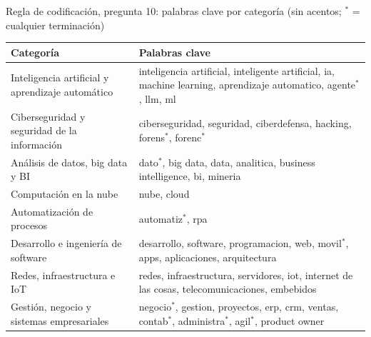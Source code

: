 \begin{mitabla}{Regla de codificación, pregunta 10: palabras clave por categoría (sin acentos; $^{*}$ = cualquier terminación)}
\begin{tabular}{L{5.2cm}L{9.4cm}}
\toprule
Categoría & Palabras clave \\
\midrule
Inteligencia artificial y aprendizaje automático & inteligencia artificial, inteligente artificial, ia, machine learning, aprendizaje automatico, agente$^{*}$, llm, ml \\
Ciberseguridad y seguridad de la información & ciberseguridad, seguridad, ciberdefensa, hacking, forens$^{*}$, forenc$^{*}$ \\
Análisis de datos, big data y BI & dato$^{*}$, big data, data, analitica, business intelligence, bi, mineria \\
Computación en la nube & nube, cloud \\
Automatización de procesos & automatiz$^{*}$, rpa \\
Desarrollo e ingeniería de software & desarrollo, software, programacion, web, movil$^{*}$, apps, aplicaciones, arquitectura \\
Redes, infraestructura e IoT & redes, infraestructura, servidores, iot, internet de las cosas, telecomunicaciones, embebidos \\
Gestión, negocio y sistemas empresariales & negocio$^{*}$, gestion, proyectos, erp, crm, ventas, contab$^{*}$, administra$^{*}$, agil$^{*}$, product owner \\
\bottomrule
\end{tabular}
\end{mitabla}

